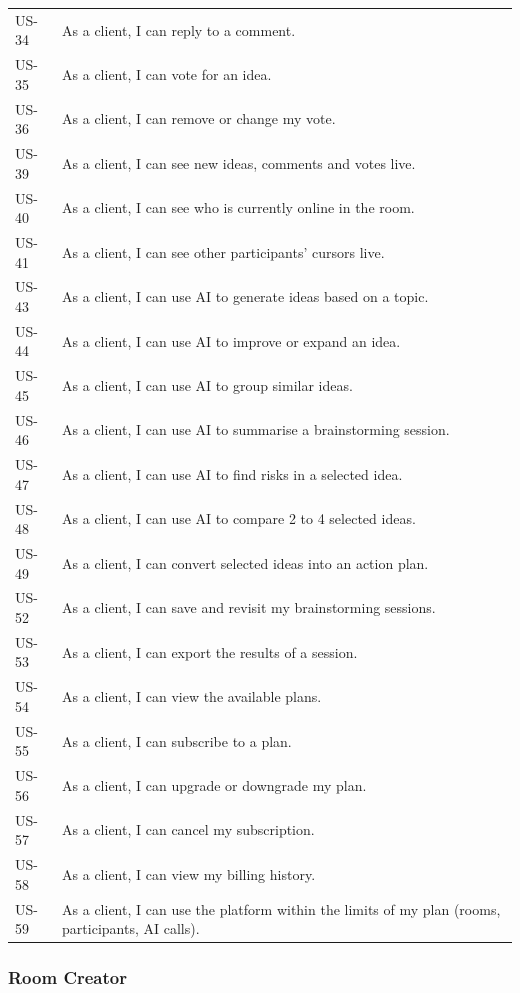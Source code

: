 \documentclass[12pt,a4paper]{report}
\begin{document}
\begin{longtable}{@{}p{}p{}@{}}
US-34 & As a client, I can reply to a comment. \\
US-35 & As a client, I can vote for an idea. \\
US-36 & As a client, I can remove or change my vote. \\
US-39 & As a client, I can see new ideas, comments and votes live. \\
US-40 & As a client, I can see who is currently online in the room. \\
US-41 & As a client, I can see other participants' cursors live. \\
US-43 & As a client, I can use AI to generate ideas based on a topic. \\
US-44 & As a client, I can use AI to improve or expand an idea. \\
US-45 & As a client, I can use AI to group similar ideas. \\
US-46 & As a client, I can use AI to summarise a brainstorming session. \\
US-47 & As a client, I can use AI to find risks in a selected idea. \\
US-48 & As a client, I can use AI to compare 2 to 4 selected ideas. \\
US-49 & As a client, I can convert selected ideas into an action plan. \\
US-52 & As a client, I can save and revisit my brainstorming sessions. \\
US-53 & As a client, I can export the results of a session. \\
US-54 & As a client, I can view the available plans. \\
US-55 & As a client, I can subscribe to a plan. \\
US-56 & As a client, I can upgrade or downgrade my plan. \\
US-57 & As a client, I can cancel my subscription. \\
US-58 & As a client, I can view my billing history. \\
US-59 & As a client, I can use the platform within the limits of my plan (rooms, participants, AI calls). \\
\end{longtable}

\subsubsection*{Room Creator}
\end{document}
